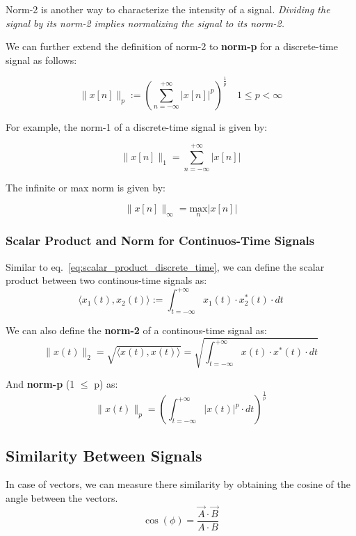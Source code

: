 \documentclass[letterpaper,12pt]{article}
\begin{document}
Norm-2 is another way to characterize the intensity of a signal.\textit{ Dividing the signal by its norm-2 implies normalizing the signal to its norm-2.}

We can further extend the definition of norm-2 to \textbf{norm-p}  for a discrete-time signal as follows:

\begin{equation}
    \label{eq:norm_p_discrete_time}
    \| x[n] \|_p := {(\sum_{n=-\infty}^{+\infty} |x[n]|^{p})}^{\frac{1}{p}} \quad 1 \leq p < \infty
\end{equation}

For example, the norm-1 of a discrete-time signal is given by:

\[\| x[n] \|_1 = \sum_{n=-\infty}^{+\infty} |x[n]| \]

The infinite or max norm is given by:

\[\| x[n] \|_\infty = \underset{n}{\text{max}} |x[n]| \]

\subsubsection*{Scalar Product and Norm for Continuos-Time Signals}

Similar to eq.~\ref{eq:scalar_product_discrete_time}, we can define the scalar product between two continous-time signals as:
\begin{equation}
    \label{eq:scalar_product_cont_time}
    \langle x_{1}(t), x_{2}(t) \rangle := \int_{t=-\infty}^{+\infty} x_{1}(t) \cdot x_{2}^{*}(t) \cdot dt
\end{equation}

We can also define the \textbf{norm-2} of a continous-time signal as:
\begin{equation}
    \label{eq:norm_2_cont_time}
    \| x(t) \|_2 = \sqrt{\langle x(t), x(t) \rangle} = \sqrt{\int_{t=-\infty}^{+\infty} x(t) \cdot x^{*}(t) \cdot dt}
\end{equation}

And \textbf{norm-p} (1 $\leq$ p) as:
\begin{equation}
    \label{eq:norm_p_cont_time}
    \| x(t) \|_p = {(\int_{t=-\infty}^{+\infty} |x(t)|^{p} \cdot dt)}^{\frac{1}{p}}
\end{equation}

\subsection*{Similarity Between Signals}
In case of vectors, we can measure there similarity by obtaining the cosine of the angle between the vectors.
\[\cos(\phi) = \frac{\Vec{A} \cdot \Vec{B}}{A \cdot B}\]
\end{document}

